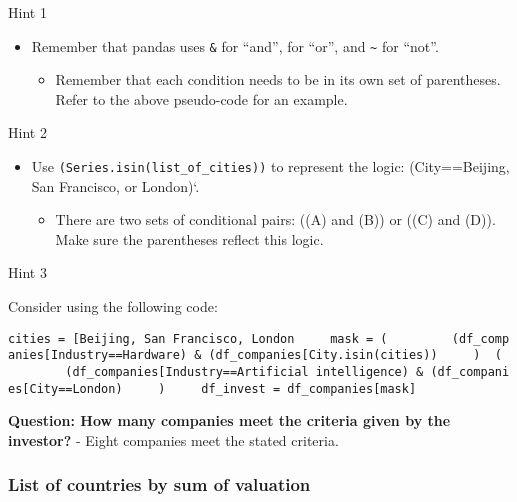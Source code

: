 \documentclass[11pt]{article}
\providecommand{\tightlist}{%
      \setlength{\itemsep}{0pt}\setlength{\parskip}{0pt}}
\begin{document}
    Hint 1

\begin{itemize}
\tightlist
\item
  Remember that pandas uses \texttt{\&} for ``and'', \texttt{\textbar{}}
  for ``or'', and \texttt{\textasciitilde{}} for ``not''.

  \begin{itemize}
  \tightlist
  \item
    Remember that each condition needs to be in its own set of
    parentheses. Refer to the above pseudo-code for an example.
  \end{itemize}
\end{itemize}

    Hint 2

\begin{itemize}
\tightlist
\item
  Use \texttt{(Series.isin(list\_of\_cities))} to represent the logic:
  (City==Beijing, San Francisco, or London)`.

  \begin{itemize}
  \tightlist
  \item
    There are two sets of conditional pairs: ((A) and (B)) or ((C) and
    (D)). Make sure the parentheses reflect this logic.
  \end{itemize}
\end{itemize}

    Hint 3

Consider using the following code:

\texttt{cities\ =\ {[}\textquotesingle{}Beijing\textquotesingle{},\ \textquotesingle{}San\ Francisco\textquotesingle{},\ \textquotesingle{}London\textquotesingle{}{]}\ \ \ \ \ mask\ =\ (\ \ \ \ \ \ \ \ \ (df\_companies{[}\textquotesingle{}Industry\textquotesingle{}{]}==\textquotesingle{}Hardware\textquotesingle{})\ \&\ (df\_companies{[}\textquotesingle{}City\textquotesingle{}{]}.isin(cities))\ \ \ \ \ )\ \textbar{}\ (\ \ \ \ \ \ \ \ \ (df\_companies{[}\textquotesingle{}Industry\textquotesingle{}{]}==\textquotesingle{}Artificial\ intelligence\textquotesingle{})\ \&\ (df\_companies{[}\textquotesingle{}City\textquotesingle{}{]}==\textquotesingle{}London\textquotesingle{})\ \ \ \ \ )\ \ \ \ \ df\_invest\ =\ df\_companies{[}mask{]}}

    \textbf{Question: How many companies meet the criteria given by the
investor?} - Eight companies meet the stated criteria.

    \hypertarget{list-of-countries-by-sum-of-valuation}{%
\subsubsection{List of countries by sum of
valuation}\label{list-of-countries-by-sum-of-valuation}}
\end{document}

